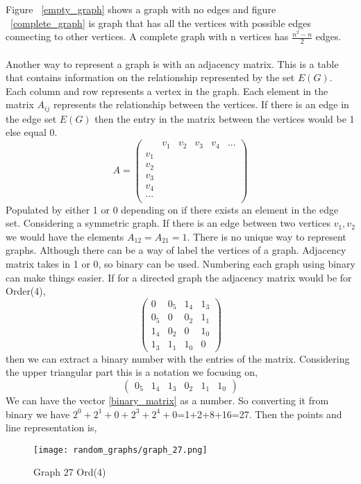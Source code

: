 \documentclass[15pt, a4paper]{Assignment}
\begin{document}
Figure ~\ref{empty_graph} shows a graph with no edges and figure ~\ref{complete_graph} is graph that has all the vertices with possible edges connecting to other vertices.
A complete graph with n vertices has ${\frac{n^2-n}{2}}$ edges.
\\\\
Another way to represent a graph is with an adjacency matrix.
This is a table that contains information on the relationship represented by the set $ E(G)$.
Each column and row represents a vertex in the graph.
Each element in the matrix $A_{ij}$ represents the relationship between the vertices.
If there is an edge in the edge set $E(G)$ then the entry in the matrix between the vertices would be 1 else equal 0.
\begin{equation}
A=	\begin{pmatrix}
		&v_1&v_2&v_3&v_4&...\\
		v_1&&&&&\\
		v_2&&&&&\\
		v_3&&&&&\\
		v_4&&&&&\\
		...&&&&&\\
	\end{pmatrix}
\end{equation}
Populated by either 1 or 0 depending on if there exists an element in the edge set.
Considering a symmetric graph.
If there is an edge between two vertices $v_1 ,v_2$ we would have the elements $A_{12} = A_{21}=1$. 
There is no unique way to represent graphs.
Although there can be a way of label the vertices of a graph.
Adjacency matrix takes in 1 or 0, so binary can be used.
Numbering each graph using binary can make things easier.
If for a directed graph the adjacency matrix would be for Order(4),
\begin{equation}
	\begin{pmatrix}
		0&0_5&1_4&1_3\\
		0_5&0&0_2&1_1\\
		1_4&0_2&0&1_0\\	
		1_3&1_1&1_0&0
	\end{pmatrix}\label{adj_mat}
\end{equation}
then we can extract a binary number with the entries of the matrix.
Considering the upper triangular part this is a notation we focusing on,
\begin{equation}
	\begin{pmatrix}
		0_5&1_4&1_3&0_2&1_1&1_0
	\end{pmatrix}\label{binary_matrix}
\end{equation}
We can have the vector \ref{binary_matrix} as a number.
So converting it from binary we have $2^0+2^1+0+2^3+2^4+0$=1+2+8+16=27.
Then the points and line representation is,
\begin{figure}[H]
	\centering
	\texttt{[image: random\_graphs/graph\_27.png]}
	\caption{Graph 27 Ord(4)}
	\label{graph 27}
\end{figure}
\end{document}
